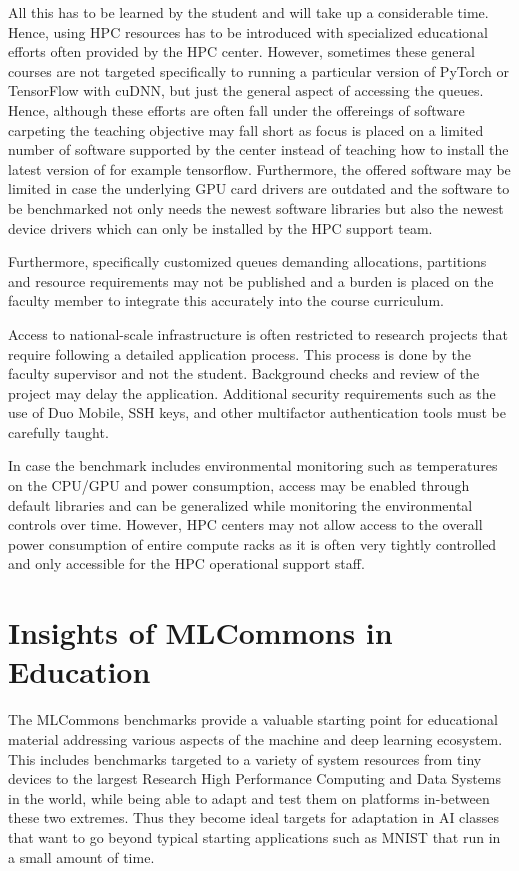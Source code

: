 \documentclass[utf8]{FrontiersinVancouver} %
\begin{document}
All this has to be learned by the student and will take up a
considerable time. Hence, using HPC resources has to be introduced
with specialized educational efforts often provided by the HPC
center. However, sometimes these general courses are not targeted
specifically to running a particular version of PyTorch or TensorFlow
with cuDNN, but just the general aspect of accessing the
queues. Hence, although these efforts are often fall under the
offereings of software carpeting the teaching objective may fall short
as focus is placed on a limited number of software supported by the
center instead of teaching how to install the latest version of for
example tensorflow. Furthermore, the offered software may be limited
in case the underlying GPU card drivers are outdated and the software
to be benchmarked not only needs the newest software libraries but
also the newest device drivers which can only be installed by the HPC
support team.

Furthermore, specifically customized queues demanding allocations,
partitions and resource requirements may not be published and a burden
is placed on the faculty member to integrate this accurately into the
course curriculum.

Access to national-scale infrastructure is often restricted to
research projects that require following a detailed application
process. This process is done by the faculty supervisor and not the
student. Background checks and review of the project may delay the
application. Additional security requirements such as the use of Duo
Mobile, SSH keys, and other multifactor authentication tools must be
carefully taught.

In case the benchmark includes environmental monitoring such as
temperatures on the CPU/GPU and power consumption, access may be
enabled through default libraries and can be generalized while
monitoring the environmental controls over time. However, HPC centers
may not allow access to the overall power consumption of entire
compute racks as it is often very tightly controlled and only
accessible for the HPC operational support staff.

\section{Insights of MLCommons in Education}
\label{sec:edu-mlcommons-insights}

The MLCommons benchmarks provide a valuable starting point for
educational material addressing various aspects of the machine and
deep learning ecosystem. This includes benchmarks targeted to a
variety of system resources from tiny devices to the largest Research
High Performance Computing and Data Systems in the world, while being
able to adapt and test them on platforms in-between these two
extremes. Thus they become ideal targets for adaptation in AI classes
that want to go beyond typical starting applications such as MNIST
that run in a small amount of time.
\end{document}
